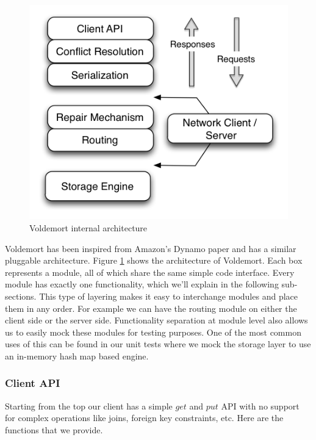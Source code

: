 \documentclass[10pt,twocolumn,preprint,natbib,authoryear]{sigplanconf}
\begin{document}
\begin{figure}
  \centering
    \includegraphics[scale=0.45]{arch.png}
  \caption{Voldemort internal architecture}
  \label{arch}
\end{figure}


Voldemort has been inspired from Amazon's Dynamo paper and has a similar pluggable architecture. Figure \ref{arch} shows the architecture of Voldemort. Each box represents a module, all of which share the same simple code interface. Every module has exactly one functionality, which we'll explain in the following sub-sections. This type of layering makes it easy to interchange modules and place them in any order. For example we can have the routing module on either the client side or the server side. Functionality separation at module level also allows us to easily mock these modules for testing purposes. One of the most common uses of this can be found in our unit tests where we mock the storage layer to use an in-memory hash map based engine. 


\subsubsection {Client API }  
\label{sec:system_architecture:system_components:client_api}

Starting from the top our client has a simple $get$ and $put$ API with no support for complex operations like joins, foreign key constraints, etc. Here are the functions that we provide. 
\end{document}
